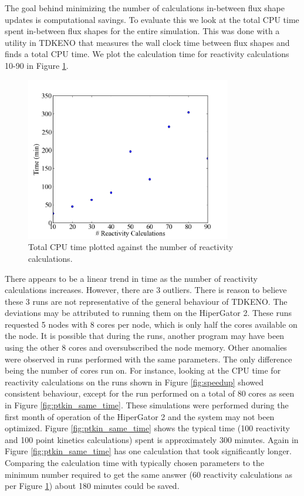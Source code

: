 \documentclass{anstrans}
\begin{document}
The goal behind minimizing the number of calculations in-between flux shape updates is computational savings.  To evaluate this we look at the total CPU time spent in-between flux shapes for the entire simulation.  This was done with a utility in TDKENO that measures the wall clock time between flux shapes and finds a total CPU time. We plot the calculation time for reactivity calculations 10-90 in Figure \ref{fig:ptkin_time}.  

\begin{figure}[h]
    \centering
    \includegraphics[width=9cm]{figures/ptkin_time_var.png}
    \caption{Total CPU time plotted against the number of reactivity calculations. }
    \label{fig:ptkin_time}
\end{figure}

There appears to be a linear trend in time as the number of reactivity calculations increases.  However, there are 3 outliers.  There is reason to believe these 3 runs are not representative of the general behaviour of TDKENO. The deviations may be attributed to running them on the HiperGator 2. These runs requested 5 nodes with 8 cores per node, which is only half the cores available on the node.  It is possible that during the runs, another program may have been using the other 8 cores and oversubscribed the node memory.  Other anomalies were observed in runs performed with the same parameters. The only difference being the number of cores run on.  For instance, looking at the CPU time for reactivity calculations on the runs shown in Figure \ref{fig:speedup} showed consistent behaviour, except for the run performed on a total of 80 cores as seen in Figure \ref{fig:ptkin_same_time}. These simulations were performed during the first month of operation of the HiperGator 2 and the system may not been optimized.  Figure \ref{fig:ptkin_same_time} shows the typical time (100 reactivity and 100 point kinetics calculations) spent  is approximately 300 minutes. Again in Figure \ref{fig:ptkin_same_time} has one calculation that took significantly longer.  Comparing the calculation time with typically chosen parameters to the minimum number required to get the same answer (60 reactivity calculations as per Figure \ref{fig:ptkin_time}) about 180 minutes could be saved.  
\end{document}
